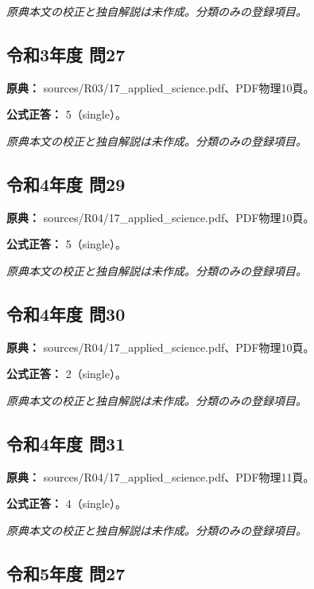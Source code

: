 \par\textit{原典本文の校正と独自解説は未作成。分類のみの登録項目。}

\subsection{令和3年度 問27}
\label{q:r03-reg-applied-27}

\noindent\textbf{原典：} sources/R03/17\_applied\_science.pdf、PDF物理10頁。

\textbf{公式正答：} 5（single）。

\par\textit{原典本文の校正と独自解説は未作成。分類のみの登録項目。}

\subsection{令和4年度 問29}
\label{q:r04-reg-applied-29}

\noindent\textbf{原典：} sources/R04/17\_applied\_science.pdf、PDF物理10頁。

\textbf{公式正答：} 5（single）。

\par\textit{原典本文の校正と独自解説は未作成。分類のみの登録項目。}

\subsection{令和4年度 問30}
\label{q:r04-reg-applied-30}

\noindent\textbf{原典：} sources/R04/17\_applied\_science.pdf、PDF物理10頁。

\textbf{公式正答：} 2（single）。

\par\textit{原典本文の校正と独自解説は未作成。分類のみの登録項目。}

\subsection{令和4年度 問31}
\label{q:r04-reg-applied-31}

\noindent\textbf{原典：} sources/R04/17\_applied\_science.pdf、PDF物理11頁。

\textbf{公式正答：} 4（single）。

\par\textit{原典本文の校正と独自解説は未作成。分類のみの登録項目。}

\subsection{令和5年度 問27}
\label{q:r05-reg-applied-27}


